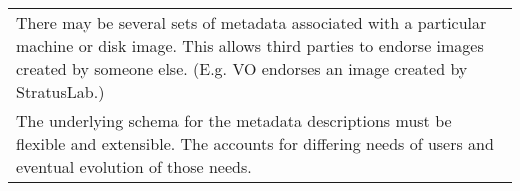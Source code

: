 \begin{table}
\begin{center}
\begin{tabular}{p{}}
\\ There may be several sets of metadata associated with a
  particular machine or disk image. This allows third parties to
  endorse images created by someone else. (E.g. VO endorses an image
  created by StratusLab.)

\\ The underlying schema for the metadata descriptions must be
  flexible and extensible.  The accounts for differing needs of users
  and eventual evolution of those needs.

\\
\hline\hline
\end{tabular}
\end{center}
\end{table}
